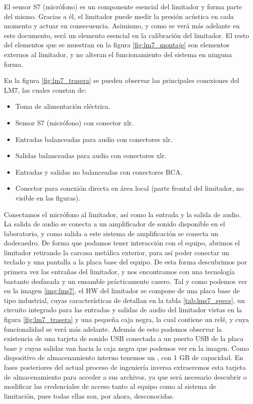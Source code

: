 El sensor S7 (micrófono) es un componente esencial del limitador y forma parte del mismo. Gracias a él, el limitador puede medir la presión acústica en cada momento y actuar en consecuencia. Asimismo, y como se verá más adelante en este documento, será un elemento esencial en la calibración del limitador. El resto del elementos que se muestran en la figura \ref{fig:lm7_montaje} son elementos externos al limitador, y no alteran el funcionamiento del sistema en ninguna forma.

En la figura \ref{fig:lm7_trasera} se pueden observar las principales conexiones del \acrshort{LM7}, las cuales constan de:

\begin{itemize}
    \item Toma de alimentación eléctrica.
    \item Sensor S7 (micrófono) con conector \acrshort{xlr}.
    \item Entradas balanceadas para audio con conectores \acrshort{xlr}.
    \item Salidas balanceadas para audio con conectores \acrshort{xlr}.
    \item Entradas y salidas no balanceadas con conectores \gls{RCA}.
    \item Conector  para conexión directa en área local (parte frontal del limitador, no visible en las figuras).
\end{itemize}

Conectamos el micrófono al limitador, así como la entrada y la salida de audio. La salida de audio se conecta a un amplificador de sonido disponible en el laboratorio, y como salida a este sistema de amplificación se conecta un dodecaedro. De forma que podamos tener interacción con el equipo, abrimos el limitador retirando la carcasa metálica exterior, para así poder conectar un teclado y una pantalla a la placa base del equipo. De esta forma descubrimos por primera vez las entrañas del limitador, y nos encontramos con una tecnología bastante desfasada y un ensamble prácticamente casero. Tal y como podemos ver en la imagen \ref{img:lms7}, el \gls{HW} del limitador se compone de una placa base de tipo industrial, cuyas características de detallan en la tabla \ref{tab:lms7_specs}, un circuito integrado para las entradas y salidas de audio del limitador vistas en la figura \ref{fig:lm7_trasera} y una pequeña caja negra, la cual contiene un relé, y cuya funcionalidad se verá más adelante. Además de esto podemos observar la existencia de una tarjeta de sonido \acrshort{USB} conectada a un puerto \acrshort{USB} de la placa base y cuyas salidas van hacia la caja negra que podemos ver en la imagen. Como dispositivo de almacenamiento interno tenemos un , con 1 GB de capacidad. En fases posteriores del actual proceso de ingeniería inversa extraeremos esta tarjeta de almacenamiento para acceder a sus archivos, ya que será necesario descubrir o modificar las credenciales de acceso tanto al equipo como al sistema de limitación, pues todas ellas son, por ahora, desconocidas.

